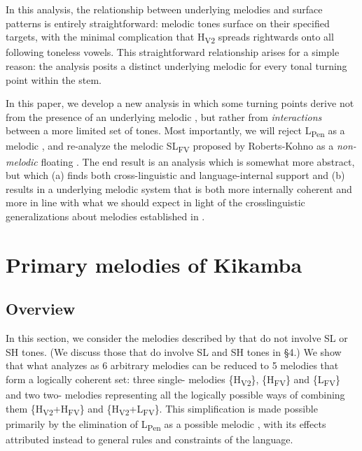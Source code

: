 \documentclass[output=paper
,newtxmath
,modfonts
,nonflat]{langsci/langscibook}
\begin{document}
In this analysis, the relationship between underlying  melodies and surface  patterns is entirely straightforward: melodic tones surface on their specified targets, with the minimal complication that H\textsubscript{V2} spreads rightwards onto all following toneless vowels. This straightforward relationship arises for a simple reason: the analysis posits a distinct underlying melodic  for every tonal turning point within the stem.

In this paper, we develop a new analysis in which some turning points derive not from the presence of an underlying melodic , but rather from \textit{interactions} between a more limited set of tones. Most importantly, we will reject L\textsubscript{Pen} as a melodic , and re-analyze the melodic SL\textsubscript{FV}  proposed by Roberts-Kohno as a \textit{non-melodic} floating . The end result is an analysis which is somewhat more abstract, but which (a) finds both cross-linguistic and language-internal support and (b) results in a underlying melodic system that is both more internally coherent and more in line with what we should expect in light of the crosslinguistic generalizations about  melodies established in .

\section{Primary melodies of Kikamba} 
\subsection{Overview}

In this section, we consider the melodies described by \citet{Roberts-Kohno2014} that do not involve SL or SH tones. (We discuss those that do involve SL and SH tones in §4.) We show that what \citet{Roberts-Kohno2014} analyzes as 6 arbitrary melodies can be reduced to 5 melodies that form a logically coherent set: three single- melodies \{H\textsubscript{V2}\}, \{H\textsubscript{FV}\} and \{L\textsubscript{FV}\} and two two- melodies representing all the logically possible ways of combining them \{H\textsubscript{V2}+H\textsubscript{FV}\} and \{H\textsubscript{V2}+L\textsubscript{FV}\}. This simplification is made possible primarily by the elimination of L\textsubscript{Pen} as a possible melodic , with its effects attributed instead to general rules and constraints of the language.
\end{document}
